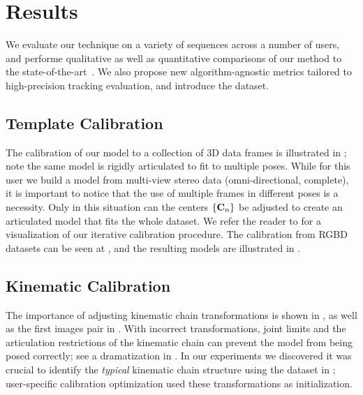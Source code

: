 
\section{Results}
\label{sec:results}
We evaluate our technique on a variety of sequences across a number of users, and performe qualitative as well as quantitative comparisons of our method to the state-of-the-art~\cite{qian2014realtime,sridhar2015fast,tagliasacchi2015robust,sharp2015accurate,taylor2016concerto}. We also propose new algorithm-agnostic metrics tailored to high-precision tracking evaluation, and introduce the \handy{} dataset.

\subsection*{Template Calibration}
The calibration of our model to a collection of 3D data frames is illustrated in ; note the same model is rigidly articulated to fit to multiple poses. While for this user we build a model from multi-view stereo data (omni-directional, complete), it is important to notice that the use of multiple frames in different poses is a necessity. Only in this situation can the centers ${\{\mathbf{C}_n\}}$ be  adjusted to create an articulated model that  fits the whole dataset. We refer the reader to \VideoMVS{} for a visualization of our iterative calibration procedure. The calibration from RGBD datasets can be seen at \VideoCalibRGB{}, and the resulting models are illustrated in . 

\subsection*{Kinematic Calibration}
The importance of adjusting kinematic chain transformations is shown in , as well as the first images pair in . With incorrect  transformations, joint limits and the articulation restrictions of the kinematic chain can prevent the model from being posed correctly; see a dramatization in \VideoKinematic{}. In our experiments we discovered it was crucial to identify the \emph{typical} kinematic chain structure using the dataset in ; user-specific calibration optimization used these transformations as initialization.


